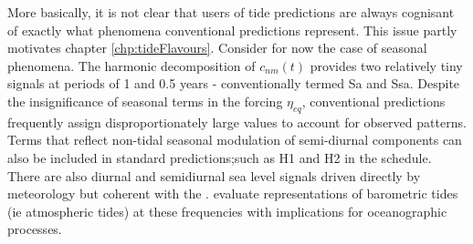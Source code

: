 More basically, it is not clear that users of tide predictions are always cognisant of exactly what phenomena conventional predictions represent.    This issue partly motivates chapter \ref{chp:tideFlavours}.
Consider for now the case of seasonal phenomena.   The harmonic decomposition of $c_{nm}(t)$ provides two relatively tiny signals at periods of 1 and 0.5 years - conventionally termed Sa and Ssa.  Despite the insignificance of seasonal terms in the forcing $\eta_{eq}$, conventional predictions frequently assign  disproportionately large values to account for observed patterns.  
Terms that reflect non-tidal seasonal modulation of semi-diurnal components can also be included in standard predictions;such as H1 and H2 in the \citet{Foreman:1977ua} schedule.  There are also  diurnal and semidiurnal sea level signals driven directly by meteorology but coherent with the \ATGP{}. \citet{Ray:2003ui} evaluate \NWP{} representations of barometric tides (ie atmospheric tides) at these frequencies with implications for oceanographic processes.  


